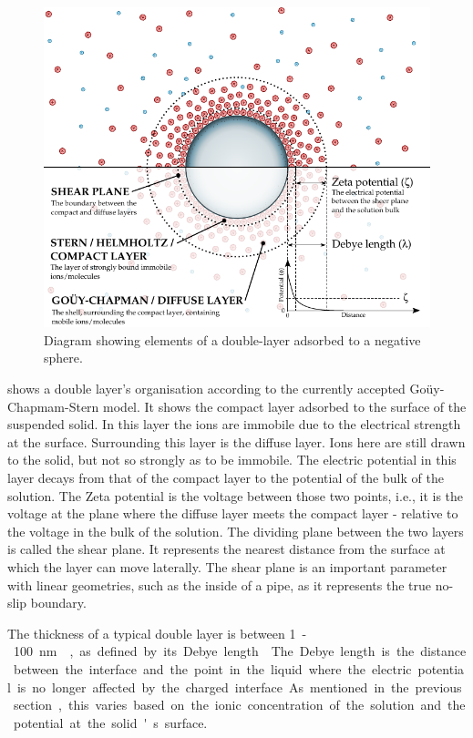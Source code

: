     \begin{figure}
      \begin{center}
        \includegraphics{content/introduction/graphics/doubleLayer_version2}
      \end{center}
      \caption{Diagram showing elements of a double-layer adsorbed to a negative sphere.}
      \label{fig:doubleLayer_anatomy}
    \end{figure}
     shows a double layer's organisation according to the currently accepted Goüy-Chapmam-Stern model.
    It shows the compact layer adsorbed to the surface of the suspended solid.
    In this layer the ions are immobile due to the electrical strength at the surface.
    Surrounding this layer is the diffuse layer.
    Ions here are still drawn to the solid, but not so strongly as to be immobile.
    The electric potential in this layer decays from that of the compact layer to the potential of the bulk of the solution.
    The Zeta potential is the voltage between those two points, i.e., it is the voltage at the plane where the diffuse layer meets the compact layer - relative to the voltage in the bulk of the solution.
    The dividing plane between the two layers is called the shear plane.
    It represents the nearest distance from the surface at which the layer can move laterally.
    The shear plane is an important parameter with linear geometries, such as the inside of a pipe, as it represents the true no-slip boundary.

    The thickness of a typical double layer is between \SI{1}-\SI{100}{\nano\meter}~\cite{Jiang2010}, as defined by its Debye length~\cite{Israelachvili2011}.
    The Debye length is the distance between the interface and the point in the liquid where the electric potential is no longer affected by the charged interface.
    As mentioned in the previous section, this varies based on the ionic concentration of the solution and the potential at the solid's surface.


